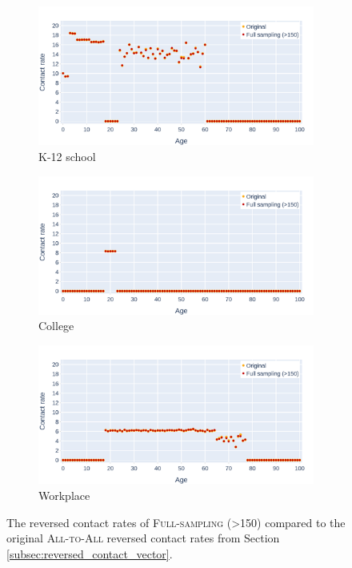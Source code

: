 \begin{figure}
    \centering
    \begin{subfigure}{.8\linewidth}
        \centering
        \includegraphics[width=\textwidth]{4 - Sampling/fig/adjusted_full_sampling/fs_pSize_vs_standard_reverse_cr_k12school.png}
        \caption{K-12 school}
        \label{fig:fs_pSize_vs_standard_reversed_cr_k12school}
    \end{subfigure}
    \begin{subfigure}{.8\linewidth}
        \centering
        \includegraphics[width=\textwidth]{4 - Sampling/fig/adjusted_full_sampling/fs_pSize_vs_standard_reverse_cr_college.png}
        \caption{College}
        \label{fig:fs_pSize_vs_standard_reversed_cr_college}
    \end{subfigure}
    \begin{subfigure}{.8\linewidth}
        \centering
        \includegraphics[width=\textwidth]{4 - Sampling/fig/adjusted_full_sampling/fs_pSize_vs_standard_reverse_cr_workplace.png}
        \caption{Workplace}
        \label{fig:fs_pSize_vs_standard_reversed_cr_workplace}
    \end{subfigure}
    \caption{The reversed contact rates of \textsc{Full-sampling (>150)} compared to the original \textsc{All-to-All} reversed contact rates from Section \ref{subsec:reversed_contact_vector}.}
\end{figure}
